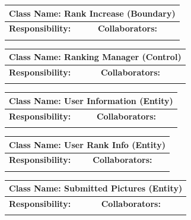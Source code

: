 \documentclass[]{article}
\begin{document}
\begin{itemize}
	\begin{table}
		\centering
		\begin{tabular}{|p{5cm}|p{5cm}|}
		\hline 
		 \multicolumn{2}{|l|}{\textbf{Class Name:} Rank Increase (Boundary)} \\
		\hline
		\textbf{Responsibility:} & \textbf{Collaborators:} \\
		\hline
		\vspace{1in} & \\
		\hline
		\end{tabular}
	\end{table}

	\begin{table}
		\centering
		\begin{tabular}{|p{5cm}|p{5cm}|}
		\hline 
		 \multicolumn{2}{|l|}{\textbf{Class Name:} Ranking Manager (Control)} \\
		\hline
		\textbf{Responsibility:} & \textbf{Collaborators:} \\
		\hline
		\vspace{1in} & \\
		\hline
		\end{tabular}
	\end{table}

	\begin{table}
		\centering
		\begin{tabular}{|p{5cm}|p{5cm}|}
		\hline 
		 \multicolumn{2}{|l|}{\textbf{Class Name:} User Information (Entity)} \\
		\hline
		\textbf{Responsibility:} & \textbf{Collaborators:} \\
		\hline
		\vspace{1in} & \\
		\hline
		\end{tabular}
	\end{table}

	\begin{table}
		\centering
		\begin{tabular}{|p{5cm}|p{5cm}|}
		\hline 
		 \multicolumn{2}{|l|}{\textbf{Class Name:} User Rank Info (Entity)} \\
		\hline
		\textbf{Responsibility:} & \textbf{Collaborators:} \\
		\hline
		\vspace{1in} & \\
		\hline
		\end{tabular}
	\end{table}

	\begin{table}
		\centering
		\begin{tabular}{|p{5cm}|p{5cm}|}
		\hline 
		 \multicolumn{2}{|l|}{\textbf{Class Name:} Submitted Pictures (Entity)} \\
		\hline
		\textbf{Responsibility:} & \textbf{Collaborators:} \\
		\hline
		\vspace{1in} & \\
		\hline
		\end{tabular}
	\end{table}


\end{itemize}
\end{document}

